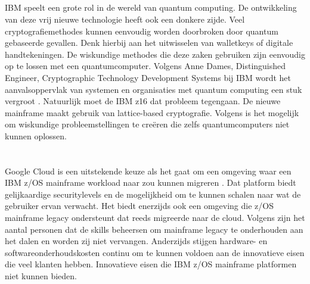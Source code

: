 \subsection{}
\label{sec:Quantum computing en IBM z16}

IBM speelt een grote rol in de wereld van quantum computing. De ontwikkeling van deze vrij nieuwe technologie heeft ook een donkere zijde. Veel cryptografiemethodes kunnen eenvoudig worden doorbroken door quantum gebaseerde gevallen. Denk hierbij aan het uitwisselen van walletkeys of digitale handtekeningen. De wiskundige methodes die deze zaken gebruiken zijn eenvoudig op te lossen met een quantumcomputer. Volgens Anne Dames, Distinguished Engineer, Cryptographic Technology Development Systems bij IBM wordt het aanvalsoppervlak van systemen en organisaties met quantum computing een stuk vergroot \autocite{Almekinders2022}. Natuurlijk moet de IBM z16 dat probleem tegengaan. De nieuwe mainframe maakt gebruik van lattice-based cryptografie. Volgens \textcite{Almekinders2022} is het mogelijk om wiskundige probleemstellingen te creëren die zelfs quantumcomputers niet kunnen oplossen. 

\section{}
\label{sec:IBM Mainframe modernisatie}


\subsection{}
\label{sec:Workloads migreren naar de cloud}


Google Cloud is een uitstekende keuze als het gaat om een omgeving waar een IBM z/OS mainframe workload naar zou kunnen migreren \autocite{Astadia2021}. Dat platform biedt gelijkaardige securitylevels en de mogelijkheid om te kunnen schalen naar wat de gebruiker ervan verwacht. Het biedt enerzijds ook een omgeving die z/OS mainframe legacy ondersteunt dat reeds migreerde naar de cloud. Volgens \textcite{Astadia2021} zijn het aantal personen dat de skills beheersen om mainframe legacy te onderhouden aan het dalen en worden zij niet vervangen. Anderzijds stijgen hardware- en softwareonderhoudskosten continu om te kunnen voldoen aan de innovatieve eisen die veel klanten hebben. Innovatieve eisen die IBM z/OS mainframe platformen niet kunnen bieden. 

